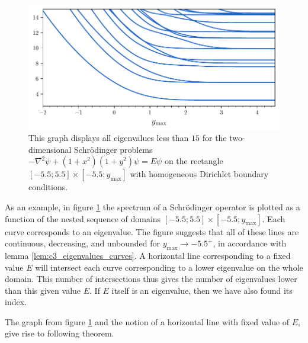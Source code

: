 \begin{figure}
  \begin{center}
    \includegraphics[width=\textwidth]{img/chapter3/counting/counting_eigenvalues.pdf}
    \caption{This graph displays all eigenvalues less than $15$ for the two-dimensional Schrödinger problems $-\nabla^2 \psi + (1+x^2)(1+y^2)\psi = E \psi$ on the rectangle $[-5.5; 5.5]\times[-5.5; y_{\text{max}}]$ with homogeneous Dirichlet boundary conditions.}\label{fig:c3_counting_eigenvalue_graph}
  \end{center}
\end{figure}

As an example, in figure \ref{fig:c3_counting_eigenvalue_graph} the spectrum of a Schrödinger operator is plotted as a function of the nested sequence of domains $[-5.5; 5.5] \times [-5.5; y_{\text{max}}]$. Each curve corresponds to an eigenvalue. The figure suggests that all of these lines are continuous, decreasing, and unbounded for $y_{\text{max}} \to -5.5^{+}$, in accordance with lemma \ref{lem:c3_eigenvalues_curves}. A horizontal line corresponding to a fixed value $E$ will intersect each curve corresponding to a lower eigenvalue on the whole domain. This number of
intersections thus gives the number of eigenvalues lower than this given value $E$. If $E$ itself is an eigenvalue, then we have also found its index.

The graph from figure \ref{fig:c3_counting_eigenvalue_graph} and the notion of a horizontal line with fixed value of $E$, give rise to following theorem.

